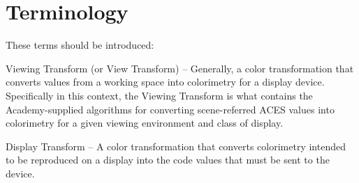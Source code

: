 \numberedformat
\chapter{Terminology}

These terms should be introduced:

Viewing Transform (or View Transform) -- Generally, a color transformation that converts values from a working space into colorimetry for a display device. Specifically in this context, the Viewing Transform is what contains the Academy-supplied algorithms for converting scene-referred ACES values into colorimetry for a given viewing environment and class of display.

Display Transform -- A color transformation that converts colorimetry intended to be reproduced on a display into the code values that must be sent to the device.